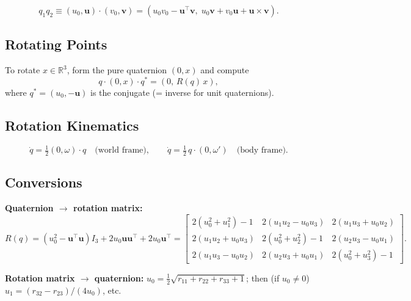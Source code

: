 \documentclass[12pt, a4paper]{article}
\begin{document}
\begin{equation}
  q_1 q_2 \equiv (u_0,\mathbf{u})\cdot(v_0,\mathbf{v})
  = (u_0 v_0 - \mathbf{u}^\top\mathbf{v},\; u_0\mathbf{v}+v_0\mathbf{u}+\mathbf{u}\times\mathbf{v}).
\end{equation}

\subsection{Rotating Points}

To rotate $x\in\mathbb{R}^3$, form the pure quaternion $(0,x)$ and
compute
\begin{equation}
  q\cdot(0,x)\cdot q^* = (0,\, R(q)\,x),
  \label{eq:q_rotate}
\end{equation}
where $q^*=(u_0,-\mathbf{u})$ is the conjugate (= inverse for unit
quaternions).

\subsection{Rotation Kinematics}

\begin{equation}
  \dot{q} = \tfrac{1}{2}(0,\omega)\cdot q \quad\text{(world frame)}, \qquad
  \dot{q} = \tfrac{1}{2}\,q\cdot(0,\omega') \quad\text{(body frame)}.
  \label{eq:qdot}
\end{equation}

\subsection{Conversions}

\textbf{Quaternion $\to$ rotation matrix:}
\begin{equation}
  R(q) = (u_0^2 - \mathbf{u}^\top\mathbf{u})I_{3} + 2u_0\mathbf{u}\mathbf{u}^\top + 2u_0\mathbf{u}^\top
  = \begin{bmatrix}
      2(u_0^2+u_1^2)-1 & 2(u_1u_2-u_0u_3) & 2(u_1u_3+u_0u_2)\\
      2(u_1u_2+u_0u_3) & 2(u_0^2+u_2^2)-1 & 2(u_2u_3-u_0u_1)\\
      2(u_1u_3-u_0u_2) & 2(u_2u_3+u_0u_1) & 2(u_0^2+u_3^2)-1
    \end{bmatrix}.
\end{equation}

\textbf{Rotation matrix $\to$ quaternion:}
$u_0 = \tfrac{1}{2}\sqrt{r_{11}+r_{22}+r_{33}+1}$; then (if $u_0\neq 0$)
$u_1=(r_{32}-r_{23})/(4u_0)$, etc.

\end{document}
